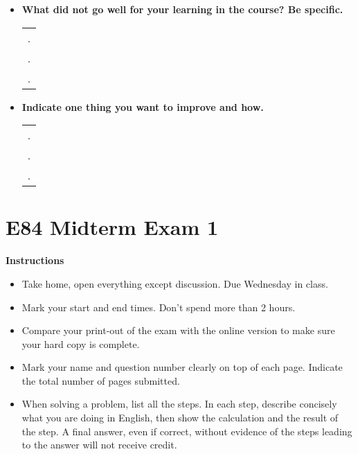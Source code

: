 \begin{itemize}
\begin{itemize}
\item {\bf What did not go well for your learning in the course? Be specific.}
\begin{tabular}{l}
.  \\
.  \\
.  \\
\end{tabular}
\vskip 0.9in

\item {\bf Indicate one thing you want to improve and how.}
\begin{tabular}{l}
.  \\
.  \\
.  \\
\end{tabular}
\vskip 0.9in

\end{itemize}

\end{itemize}


\section*{E84 Midterm Exam 1}

{\bf Instructions}
\begin{itemize}
\item Take home, open everything except discussion. Due Wednesday in class.
\item Mark your start and end times. Don't spend more than 2 hours.
\item Compare your print-out of the exam with the online version to make
	sure your hard copy is complete.
\item Mark your name and question number clearly on top of each page.
	Indicate the total number of pages submitted.
\item When solving a problem, list all the steps. In each step, describe 
	concisely what you are doing in English, then show the calculation 
	and the result of the step. A final answer, even if correct, without 
	evidence of the steps leading to the answer will not receive credit.
\end{itemize}

